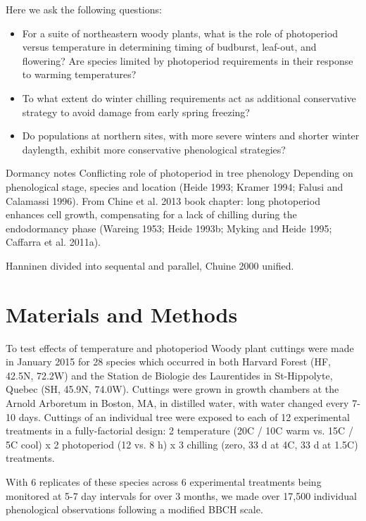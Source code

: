 \documentclass[11pt]{article}
\begin{document}
Here we ask the following questions:
\begin{itemize}
\item{For a suite of northeastern woody plants, what is the role of photoperiod versus temperature in determining timing of budburst, leaf-out, and flowering? Are species limited by photoperiod requirements in their response to warming temperatures?}
\item{To what extent do winter chilling requirements act as additional conservative strategy to avoid damage from early spring freezing?}
\item{Do populations at northern sites, with more severe winters and shorter winter daylength, exhibit more conservative phenological strategies?}
\end{itemize}


Dormancy notes
Conflicting role of photoperiod in tree phenology 
Depending on phenological stage, species and location (Heide 1993; Kramer 1994; Falusi and Calamassi 1996). 
From Chine et al. 2013 book chapter:
long photoperiod enhances cell growth, compensating for a lack of chilling during the endodormancy phase (Wareing 1953; Heide 1993b; Myking and Heide 1995; Caffarra et al. 2011a).

Hanninen divided into sequental and parallel, Chuine 2000 unified.

\section{Materials and Methods}

To test effects of temperature and photoperiod
Woody plant cuttings were made in January 2015 for 28 species which occurred in both Harvard Forest (HF, 42.5\degree N, 72.2\degree W) and the Station de Biologie des Laurentides in St-Hippolyte, Quebec (SH, 45.9\degree N, 74.0\degree W). Cuttings were grown in growth chambers at the Arnold Arboretum in Boston, MA, in distilled water, with water changed every 7-10 days. Cuttings of an individual tree were exposed to each of 12 experimental treatments in a fully-factorial design: 2 temperature (20\degree C / 10\degree C warm vs. 15\degree C / 5\degree C cool) x 2 photoperiod (12 vs. 8 h) x 3 chilling (zero,  33 d at 4\degree C, 33 d at 1.5\degree C) treatments. 

With 6 replicates of these species across 6 experimental treatments being monitored at 5-7 day intervals for over 3 months, we made over 17,500 individual phenological observations following a modified BBCH scale.
\end{document}
